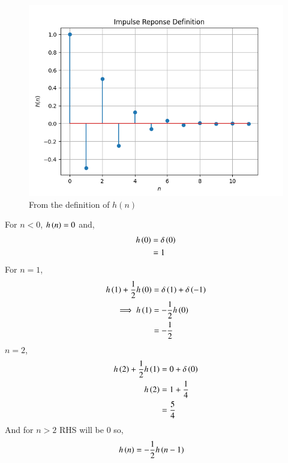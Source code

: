 \documentclass[journal,12pt,twocolumn]{IEEEtran}
\renewcommand\thesection{\arabic{section}}
\begin{document}
\begin{enumerate}[label=\thesection.\arabic*]
           \begin{figure}[ht!]
                \centering
                \includegraphics[width = \columnwidth]{figs/hndef.png}
                \caption{From the definition of $h(n)$}
                \label{hndef}
           \end{figure}
           For $n <0$, $h\left(n\right) = 0$ and,
           \begin{align}
                h\left(0\right) & = \delta\left(0\right) \\
                          & = 1
           \end{align}
           For $n =1$,
           \begin{align}
                h\left(1\right) + \frac{1}{2}h\left(0\right) & = \delta\left(1\right) + \delta\left(-1\right) \\
                \implies  h\left(1\right)              & = -\frac{1}{2}h\left(0\right)            \\
                                                 & = -\frac{1}{2}
           \end{align}
           $n=2$,
           \begin{align}
                h\left(2\right) + \frac{1}{2}h\left(1\right) & = 0 + \delta\left(0\right) \\
                h\left(2\right)                        & = 1 + \frac{1}{4}    \\
                                                 & = \frac{5}{4}
           \end{align}
           And for $n>2$ RHS will be $0$ so,
           \begin{align}
                h\brak{n} & = -\frac{1}{2}h\brak{n-1}

\end{align}
\end{enumerate}
\end{document}

